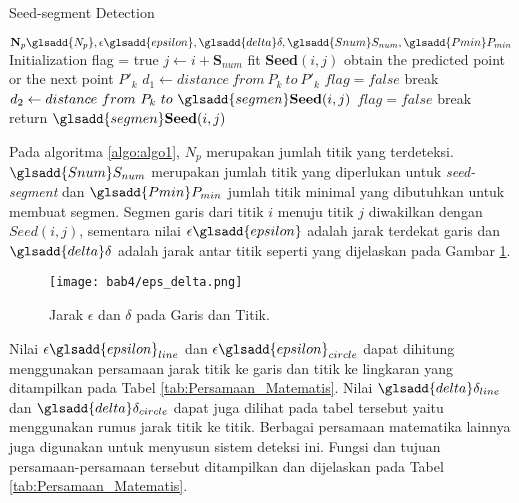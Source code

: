 \begin{algorithm}[H]
    \caption{Seed-segment Detection} 
    \label{algo:algo1}
    \begin{algorithmic}[1]
        \Require $\textbf{N}_{p}\glsadd{N_p},\epsilon\glsadd{epsilon}, \glsadd{delta}\delta, \glsadd{Snum}S_{num}, \glsadd{Pmin}P_{min}$  
        \State Initialization flag = true
            \State $j \gets i + \textbf{S}_{num}$
            \State fit \textbf{Seed}$(i,j)$
                \State obtain the predicted point or the next point $P'_{k}$
                \State $d_{1} \gets distance\ from\ P_{k}\ to\ P'_{k}$
                    \State $flag=false$
                    \State break
                \EndIf
                \State $d_{2}\gets distance\ from\ P_{k}\ to\ \glsadd{segmen}\textbf{Seed} (i,j)$
                    \State $flag = false$
                    \State break
                \EndIf 
            \EndFor
                \State return $\glsadd{segmen}\textbf{Seed} (i,j)$
            \EndIf
        \EndFor
    \end{algorithmic} 
\end{algorithm}

Pada algoritma \ref*{algo:algo1}, $N_p$ merupakan jumlah titik yang terdeteksi. $\glsadd{Snum}S_{num}$ merupakan jumlah titik yang diperlukan untuk \textit{seed-segment} dan $\glsadd{Pmin}P_{min}$ jumlah titik minimal yang dibutuhkan untuk membuat segmen. Segmen garis dari titik $i$ menuju titik $j$ diwakilkan dengan $Seed(i,j)$, sementara nilai $\epsilon\glsadd{epsilon}$ adalah jarak terdekat garis dan $\glsadd{delta}\delta$ adalah jarak antar titik seperti yang dijelaskan pada Gambar \ref{fig:Ch04_epsdelta}.

\begin{figure}[H]
    \centering
    \texttt{[image: bab4/eps\_delta.png]}
    \caption{Jarak $\epsilon$ dan $\delta$ pada Garis dan Titik.}
    \label{fig:Ch04_epsdelta}
\end{figure}
Nilai $\epsilon\glsadd{epsilon}_{line}$ dan $\epsilon\glsadd{epsilon}_{circle}$ dapat dihitung menggunakan persamaan jarak titik ke garis dan titik ke lingkaran yang ditampilkan pada Tabel \ref*{tab:Persamaan_Matematis}. Nilai $\glsadd{delta}\delta_{line}$ dan $\glsadd{delta}\delta_{circle}$ dapat juga dilihat pada tabel tersebut yaitu menggunakan rumus jarak titik ke titik. Berbagai persamaan matematika lainnya juga digunakan untuk menyusun sistem deteksi ini. Fungsi dan tujuan persamaan-persamaan tersebut ditampilkan dan dijelaskan pada Tabel \ref*{tab:Persamaan_Matematis}.

